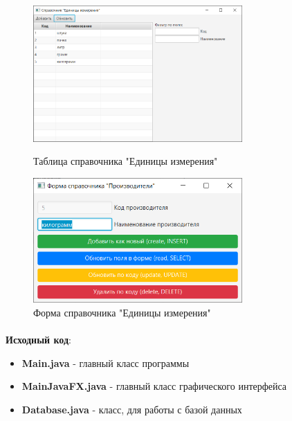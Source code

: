 \documentclass[12pt, a4paper, simple]{eskdtext}
\begin{document}
    \begin{figure}[!ph]
        \centering
        \begin{minipage}{0.49\textwidth}
            \centering
            \includegraphics[width=8cm]
                {_assets/View-Table-UnitMeasure.png}
            \caption{Таблица справочника "Единицы измерения"}
            \label{fig:View-Table-UnitMeasure}
        \end{minipage}
        \begin{minipage}{0.49\textwidth}
            \centering
            \includegraphics[width=8cm]
                {_assets/View-Form-UnitMeasure.png}
            \caption{Форма справочника "Единицы измерения"}
            \label{fig:View-Form-UnitMeasure}
        \end{minipage}
    \end{figure}

    \newpage
    \paragraph{} \textbf{Исходный код}: 

    \begin{itemize}
        \item \textbf{Main.java} - главный класс программы
        \item \textbf{MainJavaFX.java} - главный класс графического интерфейса
        \item \textbf{Database.java} - класс, для работы с базой данных
    \end{itemize}
\end{document}
